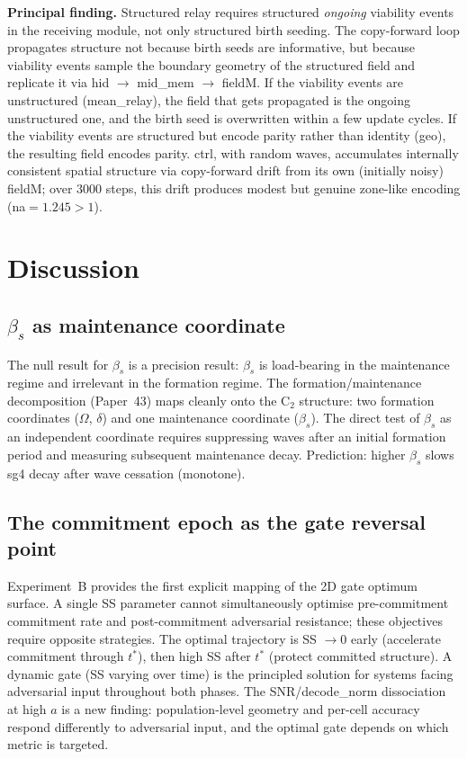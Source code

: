 \documentclass[11pt,a4paper]{article}
\begin{document}
\textbf{Principal finding.}
Structured relay requires structured \emph{ongoing} viability events in the
receiving module, not only structured birth seeding.
The copy-forward loop propagates structure not because birth seeds are informative,
but because viability events sample the boundary geometry of the structured field
and replicate it via hid $\to$ mid\_mem $\to$ fieldM.
If the viability events are unstructured (mean\_relay), the field that gets
propagated is the ongoing unstructured one, and the birth seed is overwritten
within a few update cycles.
If the viability events are structured but encode parity rather than identity
(geo), the resulting field encodes parity.
ctrl, with random waves, accumulates internally consistent spatial structure via
copy-forward drift from its own (initially noisy) fieldM; over 3000 steps,
this drift produces modest but genuine zone-like encoding (na$=1.245 > 1$).

\section{Discussion}

\subsection{$\beta_s$ as maintenance coordinate}

The null result for $\beta_s$ is a precision result: $\beta_s$ is load-bearing in
the maintenance regime and irrelevant in the formation regime.
The formation/maintenance decomposition (Paper~43) maps cleanly onto the C$_2$
structure: two formation coordinates ($\Omega$, $\delta$) and one maintenance
coordinate ($\beta_s$).
The direct test of $\beta_s$ as an independent coordinate requires suppressing waves
after an initial formation period and measuring subsequent maintenance decay.
Prediction: higher $\beta_s$ slows sg4 decay after wave cessation (monotone).

\subsection{The commitment epoch as the gate reversal point}

Experiment~B provides the first explicit mapping of the 2D gate optimum surface.
A single SS parameter cannot simultaneously optimise pre-commitment commitment rate
and post-commitment adversarial resistance; these objectives require opposite strategies.
The optimal trajectory is SS $\to 0$ early (accelerate commitment through $t^*$),
then high SS after $t^*$ (protect committed structure).
A dynamic gate (SS varying over time) is the principled solution for systems facing
adversarial input throughout both phases.
The SNR/decode\_norm dissociation at high $a$ is a new finding: population-level
geometry and per-cell accuracy respond differently to adversarial input, and the
optimal gate depends on which metric is targeted.
\end{document}
